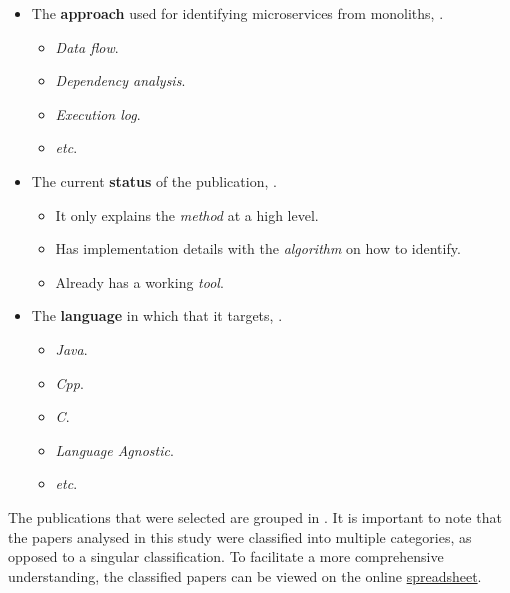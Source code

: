 \documentclass[conference]{IEEEtran}
\begin{document}
\begin{itemize}
  \item The \textbf{approach} used for identifying microservices from
    monoliths, .
  \begin{itemize}
    \item \textit{Data flow}.
    \item \textit{Dependency analysis}.
    \item \textit{Execution log}.
    \item \textit{etc}.
  \end{itemize}
  \item The current \textbf{status} of the publication,
    .
  \begin{itemize}
    \item It only explains the \textit{method} at a high level.
    \item Has implementation details with the \textit{algorithm} on how to
      identify.
    \item Already has a working \textit{tool}.
  \end{itemize}
  \item The \textbf{language} in which that it targets,
    .
  \begin{itemize}
    \item \textit{Java}.
    \item \textit{Cpp}.
    \item \textit{C}.
    \item \textit{Language Agnostic}.
    \item \textit{etc}.
  \end{itemize}
\end{itemize}

The publications that were selected are grouped in
. It is
important to note that the papers analysed in this study were classified into
multiple categories, as opposed to a singular classification. To facilitate a
more comprehensive understanding, the classified papers can be viewed on the
online
\href{https://docs.google.com/spreadsheets/d/1gKHAR6ggxMLMIDDGYsydCoVd2uOGkT6tsFIOKlr_Wos/edit?usp=share_link}{spreadsheet}.
\end{document}
